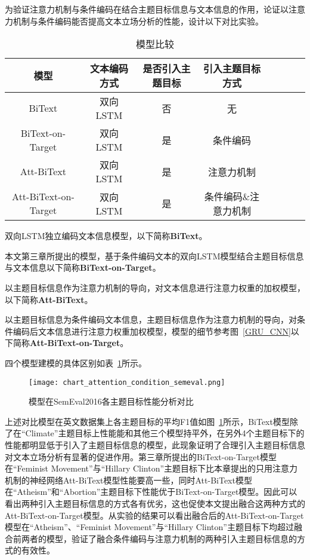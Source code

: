 为验证注意力机制与条件编码在结合主题目标信息与文本信息的作用，论证以注意力机制与条件编码能否提高文本立场分析的性能，设计以下对比实验。
\begin{table}[htbp]
	\caption[table123]{模型比较}
	\label{model_list_attention}
	\vspace{0.5em}\centering\wuhao
	\begin{tabular}{cccccccc}
		\toprule[1.5pt]
		模型&文本编码方式&是否引入主题目标&引入主题目标方式 \\
		\midrule[1pt]
		BiText&双向LSTM&否&无\\
		BiText-on-Target&双向LSTM&是&条件编码\\
		Att-BiText&双向LSTM&是&注意力机制\\
		Att-BiText-on-Target&双向LSTM&是&条件编码\&注意力机制\\
		\bottomrule[1.5pt]
	\end{tabular}
\end{table}

双向LSTM独立编码文本信息模型，以下简称\textbf{BiText}。

本文第三章所提出的模型，基于条件编码文本的双向LSTM模型结合主题目标信息与文本信息以下简称\textbf{BiText-on-Target}。

以主题目标信息作为注意力机制的导向，对文本信息进行注意力权重的加权模型，以下简称\textbf{Att-BiText}。

以主题目标信息为条件编码文本信息，主题目标信息作为注意力机制的导向，对条件编码后文本信息进行注意力权重加权模型，模型的细节参考图~\ref{GRU_CNN}以下简称\textbf{Att-BiText-on-Target}。

四个模型建模的具体区别如表~\ref{model_list_attention}所示。

\begin{figure}[htbp]
	\centering
	\texttt{[image: chart\_attention\_condition\_semeval.png]}
	\caption[rnn_vanish]{模型在SemEval2016各主题目标性能分析对比}
	\label{chart_attention_condition_semeval}
\end{figure}
上述对比模型在英文数据集上各主题目标的平均F1值如图~\ref{chart_attention_condition_semeval}所示，BiText模型除了在“Climate”主题目标上性能能和其他三个模型持平外，在另外4个主题目标下的性能都明显低于引入了主题目标信息的模型，此现象证明了合理引入主题目标信息对文本立场分析有显著的促进作用。第三章所提出的BiText-on-Target模型在“Feminist Movement”与“Hillary Clinton”主题目标下比本章提出的只用注意力机制的神经网络Att-BiText模型性能要高一些，同时Att-BiText模型在“Atheism”和“Abortion”主题目标下性能优于BiText-on-Target模型。因此可以看出两种引入主题目标信息的方式各有优劣，这也促使本文提出融合这两种方式的Att-BiText-on-Target模型。从实验的结果可以看出融合后的Att-BiText-on-Target模型在“Atheism”、“Feminist Movement”与“Hillary Clinton”主题目标下均超过融合前两者的模型，验证了融合条件编码与注意力机制的两种引入主题目标信息的方式的有效性。

